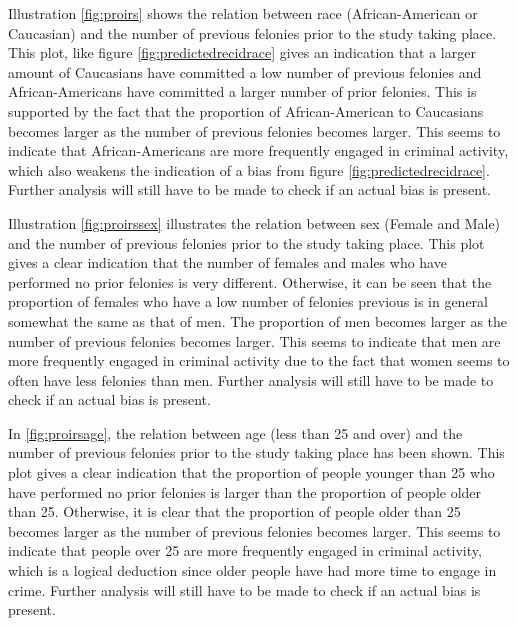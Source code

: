 \documentclass[11pt, fleqn, titlepage]{article}
\begin{document}
\noindent Illustration \ref{fig:proirs} shows the relation between race (African-American or Caucasian) and the number of previous felonies prior to the study taking place. This plot, like figure \ref{fig:predictedrecidrace} gives an indication that a larger amount of Caucasians have committed a low number of previous felonies and African-Americans have committed a larger number of prior felonies. This is supported by the fact that the proportion of African-American to Caucasians becomes larger as the number of previous felonies becomes larger. This seems to indicate that African-Americans are more frequently engaged in criminal activity, which also weakens the indication of a bias from figure \ref{fig:predictedrecidrace}. Further analysis will still have to be made to check if an actual bias is present.

Illustration \ref{fig:proirssex} illustrates the relation between sex (Female and Male) and the number of previous felonies prior to the study taking place. This plot gives a clear indication that the number of females and males who have performed no prior felonies is very different. Otherwise, it can be seen that the proportion of females who have a low number of felonies previous is in general somewhat the same as that of men. The proportion of men becomes larger as the number of previous felonies becomes larger. This seems to indicate that men are more frequently engaged in criminal activity due to the fact that women seems to often have less felonies than men. Further analysis will still have to be made to check if an actual bias is present.
	
In \ref{fig:proirsage}, the relation between age (less than 25 and over) and the number of previous felonies prior to the study taking place has been shown. This plot gives a clear indication that the proportion of people younger than 25 who have performed no prior felonies is larger than the proportion of people older than 25. Otherwise, it is clear that the proportion of people older than 25 becomes larger as the number of previous felonies becomes larger. This seems to indicate that people over 25 are more frequently engaged in criminal activity, which is a logical deduction since older people have had more time to engage in crime. Further analysis will still have to be made to check if an actual bias is present.
	
	
	
\end{document}
